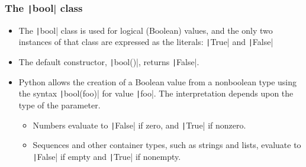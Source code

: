 \begin{frame}
    \frametitle{The \texttt|bool| class}

    \begin{itemize}
        \item The \texttt|bool| class is used for logical (Boolean) values, and the only two instances of that class are expressed as the literals: \texttt|True| and  \texttt|False|
        \item The default constructor, \texttt|bool()|, returns \texttt|False|.
        \item Python allows the creation of a Boolean value from a nonboolean type using the syntax \texttt|bool(foo)| for value \texttt|foo|. The interpretation depends upon the type of the parameter.
              \begin{itemize}
                  \item Numbers evaluate to \texttt|False| if zero, and \texttt|True| if nonzero.
                  \item Sequences and other container types, such as strings and lists, evaluate to \texttt|False| if empty and \texttt|True| if nonempty.
              \end{itemize}
    \end{itemize}

\end{frame}

